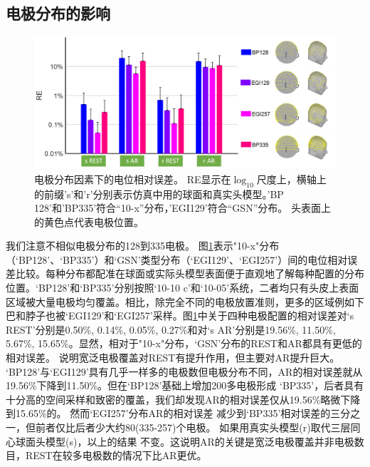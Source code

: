 \subsection{电极分布的影响}
\begin{figure}[!ht]
	\centering
	\includegraphics[width=\linewidth]{pic/JNE/figure5.png}
	\caption{电极分布因素下的电位相对误差。 RE显示在$\log_{10}$尺度上，横轴上的前缀's'和'r'分别表示仿真中用的球面和真实头模型。'BP
	128'和'BP335'符合“10-x”分布，'EGI129'符合“GSN”分布。 头表面上的黄色点代表电极位置。}
	\label{2:layre}
\end{figure}
我们注意不相似电极分布的128到335电极。 图\ref{2:layre}表示"10-x"分布（‘BP128’、‘BP335’）和‘GSN’类型分布（‘EGI129’、‘EGI257’）间的电位相对误差比较。每种分布都配准在球面或实际头模型表面便于直观地了解每种配置的分布位置。‘BP128’和‘BP335’分别按照‘10-10 c’和‘10-05’系统，二者均只有头皮上表面区域被大量电极均匀覆盖。相比，除完全不同的电极放置准则，更多的区域例如下巴和脖子也被‘EGI129’和‘EGI257’采样。图\ref{2:layre}中关于四种电极配置的相对误差对‘s REST’分别是0.50\%, 0.14\%, 0.05\%, 0.27\%和对‘s AR’分别是19.56\%, 11.50\%, 5.67\%, 15.65\%。显然，相对于"10-x"分布，‘GSN’分布的REST和AR都具有更低的相对误差。 说明宽泛电极覆盖对REST有提升作用，但主要对AR提升巨大。
‘BP128’与‘EGI129’具有几乎一样多的电极数但电极分布不同，AR的相对误差就从19.56\%下降到11.50\%。但在‘BP128’基础上增加200多电极形成
‘BP335’，后者具有十分高的空间采样和致密的覆盖，我们却发现AR的相对误差仅从19.56\%略微下降到15.65\%的。 然而‘EGI257’分布AR的相对误差
减少到‘BP335’相对误差的三分之一，但前者仅比后者少大约80(335-257)个电极。 如果用真实头模型(r)取代三层同心球面头模型(s)，以上的结果
不变。这说明AR的关键是宽泛电极覆盖并非电极数目，REST在较多电极数的情况下比AR更优。

